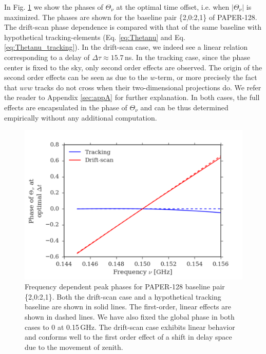 \documentclass[twocolumn,apj,numberedappendix]{emulateapj}
\renewcommand\[{\begin{equation}}
\renewcommand\]{\end{equation}}
\begin{document}
In Fig. \ref{fig:phi_nu} we show the phases of $\Theta_\nu$ at the optimal time offset, i.e. when $|\Theta_\nu|$ is maximized. The phases are shown for the baseline pair \{2,0:2,1\} of PAPER-128. The drift-scan phase dependence is compared with that of the same baseline with hypothetical tracking-elements (Eq. \eqref{eq:Thetanu} and Eq. \eqref{eq:Thetanu_tracking}). In the drift-scan case, we indeed see a linear relation corresponding to a delay of $\Delta\tau\approx15.7$\,ns.  In the tracking case, since the phase center is fixed to the sky, only second order effects are observed. The origin of the second order effects can be seen as due to the $w$-term, or more precisely the fact that $uvw$ tracks do not cross when their two-dimensional projections do. We refer the reader to Appendix \ref{sec:appA} for further explanation. In both cases, the full effects are encapsulated in the phase of $\Theta_\nu$ and can be thus determined empirically without any additional computation. 

\begin{figure}[H]
\includegraphics[width=1\linewidth]{phi_nu}

\caption{Frequency dependent peak phases for PAPER-128 baseline pair \{2,0:2,1\}. Both the drift-scan case and a hypothetical tracking baseline are shown in solid lines. The first-order, linear effects are shown in dashed lines. We have also fixed the global phase in both cases to 0 at 0.15\,GHz. The drift-scan case exhibits linear behavior and conforms well to the first order effect of a shift in delay space due to the movement of zenith. }
\label{fig:phi_nu}
\end{figure}
\end{document}

